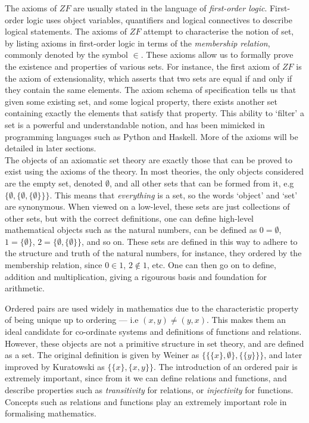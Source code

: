 \documentclass[11pt]{report}
\theoremstyle{definition}
\theoremstyle{theorem}
\theoremstyle{lemma}
\begin{document}
The axioms of $\mathit{ZF}$ are usually stated in the language of \emph{first-order logic}.
First-order logic uses object variables, quantifiers and logical connectives to describe logical statements.
The axioms of $\mathit{ZF}$ attempt to characterise the notion of set, by listing axioms in first-order logic in terms of the \emph{membership relation}, commonly denoted by the symbol $\in$.
These axioms allow us to formally prove the existence and properties of various sets.
For instance, the first axiom of $\mathit{ZF}$ is the axiom of extensionality, which asserts that two sets are equal if and only if they contain the same elements.
The axiom schema of specification tells us that given some existing set, and some logical property, there exists another set containing exactly the elements that satisfy that property.
This ability to `filter' a set is a powerful and understandable notion, and has been mimicked in programming languages such as Python and Haskell. 
More of the axioms will be detailed in later sections.\\

The objects of an axiomatic set theory are exactly those that can be proved to exist using the axioms of the theory. 
In most theories, the only objects considered are the empty set, denoted $\emptyset$, and all other sets that can be formed from it, e.g $\{\emptyset, \{\emptyset, \{\emptyset\}\}\}$. 
This means that \emph{everything} is a set, so the words `object' and `set' are synonymous.
When viewed on a low-level, these sets are just collections of other sets, but with the correct definitions, one can define high-level mathematical objects such as the natural numbers, can be defined as $0 = \emptyset$, $1=\{\emptyset\}$, $2=\{\emptyset, \{\emptyset\}\}$, and so on.
These sets are defined in this way to adhere to the structure and truth of the natural numbers, for instance, they ordered by the membership relation, since $0\in 1$, $2\notin 1$, etc.
One can then go on to define, addition and multiplication, giving a rigourous basis and foundation for arithmetic.

Ordered pairs are used widely in mathematics due to the characteristic property of being unique up to ordering --- i.e $(x,y) \neq (y,x)$.
This makes them an ideal candidate for co-ordinate systems and definitions of functions and relations.
However, these objects are not a primitive structure in set theory, and are defined as a set.
The original definition is given by Weiner as $\{\{\{x\},\emptyset\},\{\{y\}\}\}$, and later improved by Kuratowski as $\{\{x\},\{x,y\}\}$.
The introduction of an ordered pair is extremely important, since from it we can define relations and functions, and describe properties such as \emph{transitivity} for relations, or \emph{injectivity} for functions.
Concepts such as relations and functions play an extremely important role in formalising mathematics.\\
\end{document}
